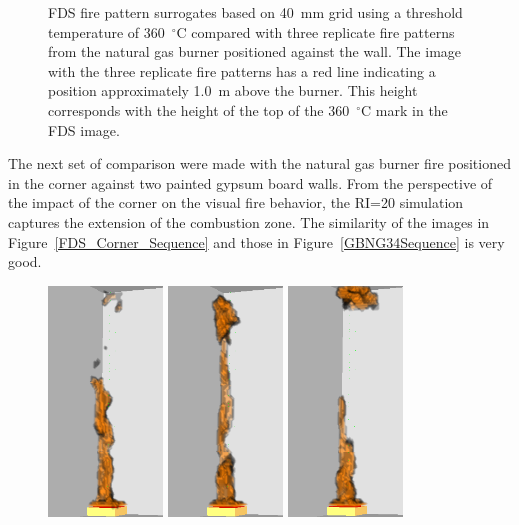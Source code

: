 \documentclass[twoside]{uocthesis}
\begin{document}
{\begin{figure}[h]
  \caption[FDS fire pattern surrogates based on 40~mm grid using a threshold temperature of 350~$^\circ$C compared with three replicate fire patterns from the natural gas burner positioned against the wall]{FDS fire pattern surrogates based on 40~mm grid using a threshold temperature of 360~$^\circ$C compared with three replicate fire patterns from the natural gas burner positioned against the wall.  The image with the three replicate fire patterns has a red line indicating a position approximately 1.0~m above the burner.  This height corresponds with the height of the top of the 360~$^\circ$C mark in the FDS image.}
  \label{FDS_FirePattern_comp}
\end{figure}

The next set of comparison were made with the natural gas burner fire positioned in the corner against two painted gypsum board walls. From the perspective of the impact of the corner on the visual fire behavior, the RI=20 simulation captures the extension of the combustion zone.  The similarity of the images in Figure~\ref{FDS_Corner_Sequence} and those in Figure~\ref{GBNG34Sequence} is very good.     

\begin{figure}[p]
	\includegraphics[width=1.2in]{../Figures/FDSNG_Corner1}
	\includegraphics[width=1.2in]{../Figures/FDSNG_Corner2}
	\includegraphics[width=1.2in]{../Figures/FDSNG_Corner3} \\


\end{figure}}
\end{document}
